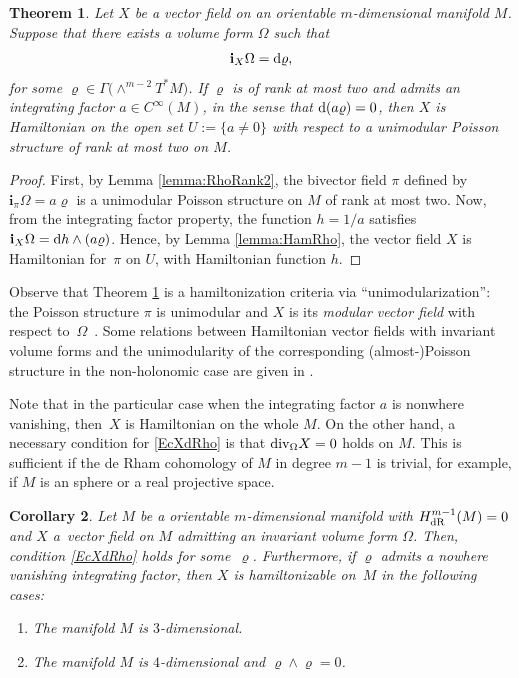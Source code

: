 \documentclass[pdftex]{sigma}%
\newcommand{\dd}{{\rm d}}
\newcommand{\ii}{\mathbf{i}}
\numberwithin{equation}{section}
\newtheorem{Theorem}{Theorem}[section]
\newtheorem{Corollary}[Theorem]{Corollary}
\begin{document}
\begin{Theorem}\label{teo:UnimodHam}
Let $X$ be a vector field on an orientable $m$-dimensional manifold $M$. Suppose that there exists a volume form $\Omega$ such that
 \begin{equation}\label{EcXdRho}
 \ii_{X}\Omega = \dd\varrho,
 \end{equation}
for some $\varrho \in \Gamma\big({\wedge}^{m-2}T^{*}M\big)$. If $\varrho$ is of rank at most two and admits an integrating factor $a \in C^{\infty}(M)$, in the sense that $\dd(a\varrho) = 0$, then $X$ is Hamiltonian on the open set $U := \{a \neq 0\}$ with respect to a unimodular Poisson structure of rank at most two on $M$.
\end{Theorem}
\begin{proof}
First, by Lemma \ref{lemma:RhoRank2}, the bivector field $\pi$ defined by $\ii_{\pi}\Omega = a\varrho$ is a unimodular Poisson structure on $M$ of rank at most two. Now, from the integrating factor property, the function $h = {1}/{a}$ satisfies $\ii_{X}\Omega = \dd{h} \wedge (a\varrho)$. Hence, by Lemma \ref{lemma:HamRho}, the vector field $X$ is Hamiltonian for~$\pi$ on $U$, with Hamiltonian function $h$.
\end{proof}

\begin{Remark}
Observe that Theorem \ref{teo:UnimodHam} is a hamiltonization criteria via ``unimodularization'': the Poisson structure $\pi$ is unimodular and $X$ is its \emph{modular vector field} with respect to~$\Omega$~\cite{We-97}. Some relations between Hamiltonian vector fields with invariant volume forms and the unimodularity of the corresponding (almost-)Poisson structure in the non-holonomic case are given in \cite{FGM-15}.
\end{Remark}

Note that in the particular case when the integrating factor $a$ is nonwhere vanishing, then~$X$ is Hamiltonian on the whole $M$. On the other hand, a necessary condition for \eqref{EcXdRho} is that ${\rm div}_{\Omega}{X} = 0$ holds on $M$. This is sufficient if the de Rham cohomology of $M$ in degree $m-1$ is trivial, for example, if $M$ is an sphere or a real projective space.

\begin{Corollary}
Let $M$ be a orientable $m$-dimensional manifold with $H^{m-1}_{{\rm dR}}(M) = 0$ and $X$ a~vector field on $M$ admitting an invariant volume form $\Omega$. Then, condition \eqref{EcXdRho} holds for some~$\varrho$. Furthermore, if $\varrho$ admits a nowhere vanishing integrating factor, then $X$ is hamiltonizable on~$M$ in the following cases:
 \begin{enumerate}\itemsep=0pt
 \item[$(a)$] The manifold $M$ is $3$-dimensional.
 \item[$(b)$] The manifold $M$ is $4$-dimensional and $\varrho \wedge \varrho = 0$.
 \end{enumerate}
\end{Corollary}
\end{document}

